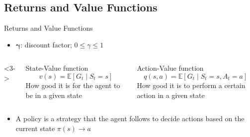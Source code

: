 \documentclass[xcolor=dvipsnames]{beamer}
\begin{document}
\subsection{Returns and Value Functions}
\begin{frame}{Returns and Value Functions}
    \begin{itemize}
    \end{itemize}

    \begin{itemize}
        \item<2-> $\boldsymbol{\gamma}$: discount factor; $0 \leq \gamma \leq 1$
    \end{itemize}
    
    \begin{columns}<3->
        \begin{column}{0.41\textwidth}
            \begin{block}{State-Value function \hfill \cite{sutton_reinforcement_2020}}
                \begin{equation*}
                    v(s) = \mathbb{E} [G_t \mid S_t = s]
                \end{equation*}
                How good it is for the agent to be in a given state
            \end{block}
        \end{column}
        \begin{column}{0.43\textwidth}
            \begin{block}{Action-Value function \hfill\cite{sutton_reinforcement_2020}}
                \begin{equation*}
                    q(s,a) = \mathbb{E} [G_t \mid S_t = s, A_t = a]
                \end{equation*}
                How good it is to perform a certain action in a given state
            \end{block}
        \end{column}
    \end{columns}
    \vspace{5mm}
    \begin{itemize}
        \item<3-> A \alert{policy} is a strategy that the agent follows to decide actions based on the current state $\pi(s) \rightarrow a$
    \end{itemize}
\end{frame}
\end{document}

